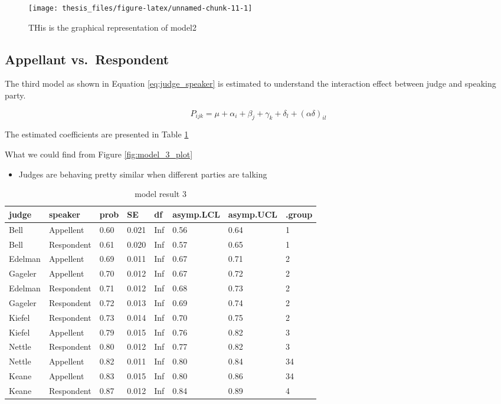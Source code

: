 \documentclass{monashthesis}
\begin{document}
\begin{figure}
\texttt{[image: thesis\_files/figure-latex/unnamed-chunk-11-1]} \caption{THis is the graphical representation of model2\label{fig:model_2_plot}}\label{fig:unnamed-chunk-11}
\end{figure}

\hypertarget{appellant-vs.respondent}{%
\subsection{Appellant vs.~Respondent}\label{appellant-vs.respondent}}

The third model as shown in Equation \ref{eq:judge_speaker} is estimated to understand the interaction effect between judge and speaking party.

\begin{equation}\label{eq:judge_speaker}
P_{ijk} = \mu + \alpha_i + \beta_j +\gamma_k + \delta_l + (\alpha\delta)_{il}
\end{equation}

The estimated coefficients are presented in Table \ref{tab:result_3}

What we could find from Figure \ref{fig:model_3_plot}

\begin{itemize}
\tightlist
\item
  Judges are behaving pretty similar when different parties are talking
\end{itemize}

\begin{table}[ht]
\begin{center}
\caption{\label{tab:result_3} model result 3}
\begin{tabular}{llllllll}
\toprule
judge & speaker & prob & SE & df & asymp.LCL & asymp.UCL & .group \\
\midrule
Bell & Appellent & 0.60 & 0.021 & Inf & 0.56 & 0.64 &  1    \\
Bell & Respondent & 0.61 & 0.020 & Inf & 0.57 & 0.65 &  1    \\
Edelman & Appellent & 0.69 & 0.011 & Inf & 0.67 & 0.71 &   2   \\
Gageler & Appellent & 0.70 & 0.012 & Inf & 0.67 & 0.72 &   2   \\
Edelman & Respondent & 0.71 & 0.012 & Inf & 0.68 & 0.73 &   2   \\
Gageler & Respondent & 0.72 & 0.013 & Inf & 0.69 & 0.74 &   2   \\
Kiefel & Respondent & 0.73 & 0.014 & Inf & 0.70 & 0.75 &   2   \\
Kiefel & Appellent & 0.79 & 0.015 & Inf & 0.76 & 0.82 &    3  \\
Nettle & Respondent & 0.80 & 0.012 & Inf & 0.77 & 0.82 &    3  \\
Nettle & Appellent & 0.82 & 0.011 & Inf & 0.80 & 0.84 &    34 \\
Keane & Appellent & 0.83 & 0.015 & Inf & 0.80 & 0.86 &    34 \\
Keane & Respondent & 0.87 & 0.012 & Inf & 0.84 & 0.89 &     4 \\
\bottomrule
\end{tabular}
\end{center}
\end{table}
\end{document}
